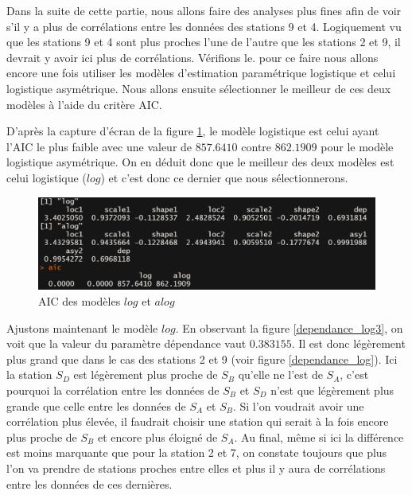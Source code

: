 \documentclass[a4paper,french,10pt]{article}
\begin{document}
Dans la suite de cette partie, nous allons faire des analyses plus fines afin de voir s'il y a plus de corrélations entre les données des stations 9 et 4. Logiquement vu que les stations 9 et 4 sont plus proches l'une de l'autre que les stations 2 et 9, il devrait y avoir ici plus de corrélations. Vérifions le. pour ce faire nous allons encore une fois utiliser les modèles d'estimation paramétrique logistique et celui logistique asymétrique. Nous allons ensuite sélectionner le meilleur de ces deux modèles à l'aide du critère AIC.

\newpage

D'après la capture d'écran de la figure \ref{AIC_9_4}, le modèle logistique est celui ayant l'AIC le plus faible avec une valeur de $857.6410$ contre $862.1909$ pour le modèle logistique asymétrique. On en déduit donc que le meilleur des deux modèles est celui logistique ($log$) et c'est donc ce dernier que nous sélectionnerons.

\begin{figure}[htp] 
	\centering
	\includegraphics[scale=0.45]{images/AIC_stations9_4.png}
	\caption{AIC des modèles $log$ et $alog$}
	\label{AIC_9_4}
\end{figure}

Ajustons maintenant le modèle $log$. En observant la figure \ref{dependance_log3}, on voit que la valeur du paramètre dépendance vaut $0.383155$. Il est donc légèrement plus grand que dans le cas des stations 2 et 9 (voir figure \ref{dependance_log}). Ici la station $S_D$ est légèrement plus proche de $S_B$ qu'elle ne l'est de $S_A$, c'est pourquoi la corrélation entre les données de $S_B$ et $S_D$ n'est que légèrement plus grande que celle entre les données de $S_A$ et $S_B$. Si l'on voudrait avoir une corrélation plus élevée, il faudrait choisir une station qui serait à la fois encore plus proche de $S_B$ et encore plus éloigné de $S_A$. Au final, même si ici la différence est moins marquante que pour la station 2 et 7, on constate toujours que plus l'on va prendre de stations proches entre elles et plus il y aura de corrélations entre les données de ces dernières.
\end{document}
